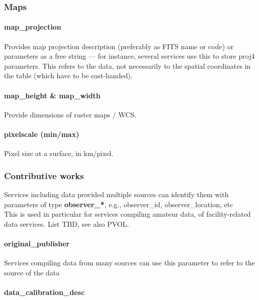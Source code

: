 \documentclass[11pt,a4paper]{ivoa}
\begin{document}
\subsubsection{Maps}

\paragraph{map\_projection}

Provides map projection description (preferably as FITS name or code) or parameters as a free string — for instance, several services use this to store proj4 parameters. This refers to the data, not necessarily to the spatial coordinates in the table (which have to be east-handed).

\paragraph{map\_height \& map\_width}

Provide dimensions of raster maps / WCS.

\paragraph{pixelscale (min/max)}

Pixel size at a surface, in km/pixel.

\subsubsection{Contributive works}

Services\textbf{ }including data provided multiple sources can identify them with parameters of type \textbf{observer\_*}, e.g., observer\_id, observer\_location, etc\\This is used in particular for services compiling amateur data, of facility-related data services. List TBD, see also PVOL.

\paragraph{original\_publisher}

Services compiling data from many sources can use this\textbf{ }parameter to refer to the source of the data

\paragraph{data\_calibration\_desc}
\end{document}
